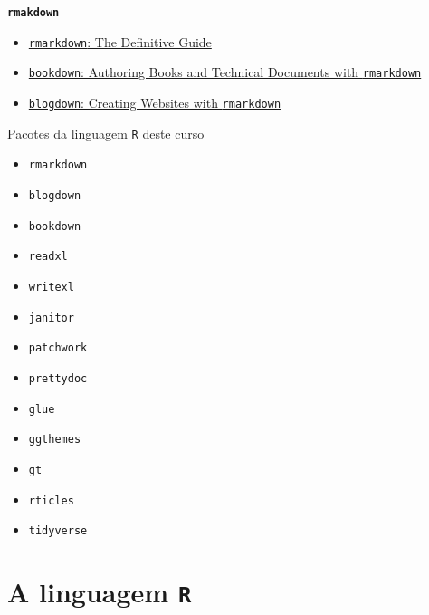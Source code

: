 \documentclass[
  10pt,
  ignorenonframetext,
]{beamer}
\providecommand{\tightlist}{%
  \setlength{\itemsep}{0pt}\setlength{\parskip}{0pt}}\usepackage{longtable,booktabs,array}
\begin{document}
\begin{frame}[fragile]
\textbf{\texttt{rmakdown}}

\begin{itemize}
\tightlist
\item
  \href{https://bookdown.org/yihui/rmarkdown/}{\texttt{rmarkdown}: The
  Definitive Guide}
\item
  \href{https://bookdown.org/yihui/bookdown/}{\texttt{bookdown}:
  Authoring Books and Technical Documents with \texttt{rmarkdown}}
\item
  \href{https://bookdown.org/yihui/blogdown/}{\texttt{blogdown}:
  Creating Websites with \texttt{rmarkdown}}
\end{itemize}
\end{frame}

\begin{frame}[fragile]{Pacotes da linguagem \texttt{R} deste curso}
\protect\hypertarget{pacotes-da-linguagem-r-deste-curso}{}
\begin{itemize}
\tightlist
\item
  \texttt{rmarkdown}
\item
  \texttt{blogdown}
\item
  \texttt{bookdown}
\item
  \texttt{readxl}
\item
  \texttt{writexl}
\item
  \texttt{janitor}
\item
  \texttt{patchwork}
\item
  \texttt{prettydoc}
\item
  \texttt{glue}
\item
  \texttt{ggthemes}
\item
  \texttt{gt}
\item
  \texttt{rticles}
\item
  \texttt{tidyverse}
\end{itemize}
\end{frame}

\hypertarget{a-linguagem-r}{%
\section{\texorpdfstring{A linguagem
\texttt{R}}{A linguagem R}}\label{a-linguagem-r}}
\end{document}
